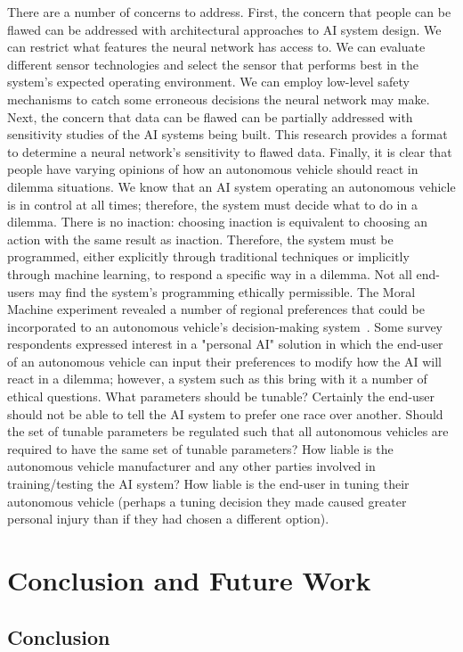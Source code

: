\documentclass[]{report}
\begin{document}
There are a number of concerns to address. First, the concern that people can be flawed can be
addressed with architectural approaches to AI system design. We can restrict what features the
neural network has access to. We can evaluate different sensor technologies and select the sensor
that performs best in the system's expected operating environment. We can employ low-level safety
mechanisms to catch some erroneous decisions the neural network may make. Next, the concern that
data can be flawed can be partially addressed with sensitivity studies of the AI systems being
built. This research provides a format to determine a neural network's sensitivity to flawed data.
Finally, it is clear that people have varying opinions of how an autonomous vehicle should react in
dilemma situations. We know that an AI system operating an autonomous vehicle is in control at all
times; therefore, the system must decide what to do in a dilemma. There is no inaction: choosing
inaction is equivalent to choosing an action with the same result as inaction. Therefore, the system
must be programmed, either explicitly through traditional techniques or implicitly through machine
learning, to respond a specific way in a dilemma. Not all end-users may find the system's
programming ethically permissible. The Moral Machine experiment revealed a number of regional
preferences that could be incorporated to an autonomous vehicle's decision-making
system~\cite{awad2018moral}. Some survey respondents expressed interest in a "personal AI" solution
in which the end-user of an autonomous vehicle can input their preferences to modify how the AI will
react in a dilemma; however, a system such as this bring with it a number of ethical questions. What
parameters should be tunable? Certainly the end-user should not be able to tell the AI system to
prefer one race over another. Should the set of tunable parameters be regulated such that all
autonomous vehicles are required to have the same set of tunable parameters? How liable is the
autonomous vehicle manufacturer and any other parties involved in training/testing the AI system?
How liable is the end-user in tuning their autonomous vehicle (perhaps a tuning decision they made
caused greater personal injury than if they had chosen a different option).

\FloatBarrier
\chapter{Conclusion and Future Work}
\section{Conclusion}
\end{document}
